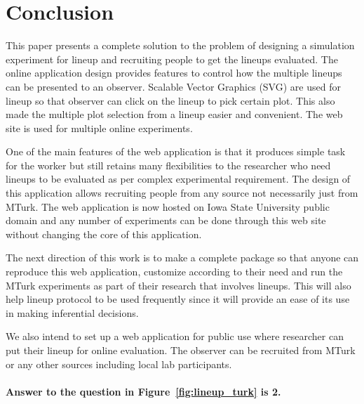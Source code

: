 \documentclass[11pt]{article}
\begin{document}




\section{Conclusion} This paper presents a complete solution to the problem of designing a simulation experiment for lineup and recruiting people to get the lineups evaluated. The online application design provides features to control how the multiple lineups can be presented to an observer. Scalable Vector Graphics (SVG) are used for lineup so that observer can click on the lineup to pick certain plot. This also made the multiple plot selection from a lineup easier and convenient. The web site is used for multiple online experiments.

One of the main features of the web application is that it produces simple task for the worker but still retains many flexibilities to the researcher who need lineups to be evaluated as per complex experimental requirement. The design of this application allows recruiting people from any source not necessarily just from MTurk. The web application is now hosted on Iowa State University public domain \citep{majumder:turk} and any number of experiments can be done through this web site without changing the core of this application.

The next direction of this work is to make a complete package so that anyone can reproduce this web application, customize according to their need and run the MTurk experiments as part of their research that involves lineups. This will also help lineup protocol to be used frequently since it will provide an ease of its use in making inferential decisions.

We also intend to set up a web application for public use where researcher can put their lineup for online evaluation. The observer can be recruited from MTurk or any other sources including local lab participants. 

\paragraph{Answer to the question in Figure~\ref{fig:lineup_turk} is 2.}
\end{document}
